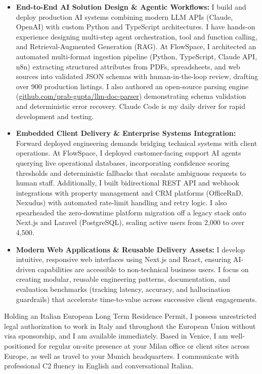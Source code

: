 \documentclass[10.5pt,a4paper]{article}
\begin{document}
\begin{itemize}
  \setlength{\itemsep}{1pt}
  \setlength{\parskip}{0pt}
  \item \textbf{End-to-End AI Solution Design \& Agentic Workflows:} I build and deploy production AI systems combining modern LLM APIs (Claude, OpenAI) with custom Python and TypeScript architectures. I have hands-on experience designing multi-step agent orchestration, tool and function calling, and Retrieval-Augmented Generation (RAG). At FlowSpace, I architected an automated multi-format ingestion pipeline (Python, TypeScript, Claude API, n8n) extracting structured attributes from PDFs, spreadsheets, and web sources into validated JSON schemas with human-in-the-loop review, drafting over 900 production listings. I also authored an open-source parsing engine (\href{https://github.com/prab-gupta/llm-doc-parser}{github.com/prab-gupta/llm-doc-parser}) demonstrating schema validation and deterministic error recovery. Claude Code is my daily driver for rapid development and testing.
  \item \textbf{Embedded Client Delivery \& Enterprise Systems Integration:} Forward deployed engineering demands bridging technical systems with client operations. At FlowSpace, I deployed customer-facing support AI agents querying live operational databases, incorporating confidence scoring thresholds and deterministic fallbacks that escalate ambiguous requests to human staff. Additionally, I built bidirectional REST API and webhook integrations with property management and CRM platforms (OfficeRnD, Nexudus) with automated rate-limit handling and retry logic. I also spearheaded the zero-downtime platform migration off a legacy stack onto Next.js and Laravel (PostgreSQL), scaling active users from 2,000 to over 4,500.
  \item \textbf{Modern Web Applications \& Reusable Delivery Assets:} I develop intuitive, responsive web interfaces using Next.js and React, ensuring AI-driven capabilities are accessible to non-technical business users. I focus on creating modular, reusable engineering patterns, documentation, and evaluation benchmarks (tracking latency, accuracy, and hallucination guardrails) that accelerate time-to-value across successive client engagements.
\end{itemize}

Holding an Italian European Long Term Residence Permit, I possess unrestricted legal authorization to work in Italy and throughout the European Union without visa sponsorship, and I am available immediately. Based in Venice, I am well-positioned for regular on-site presence at your Milan office or client sites across Europe, as well as travel to your Munich headquarters. I communicate with professional C2 fluency in English and conversational Italian.
\end{document}
